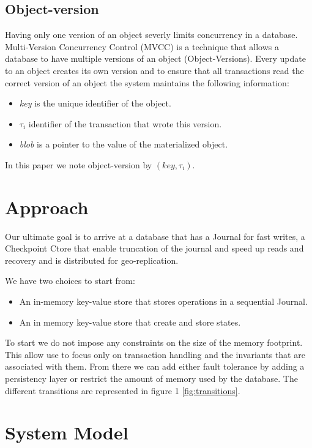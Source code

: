 \documentclass[systeme]{compas2022}
\begin{document}
\subsection{Object-version}

Having only one version of an object severly limits concurrency in a database.
Multi-Version Concurrency Control (MVCC) is a technique that allows a database to have multiple versions of an object (Object-Versions).
Every update to an object creates its own version and to ensure that all transactions read the correct version of an object the system maintains the following information: 
\begin{itemize}
  \item \emph{key} is the unique identifier of the object.
  \item \emph{$\tau_i$} identifier of the transaction that wrote this version.
  \item \emph{blob} is a pointer to the value of the materialized object.
\end{itemize}

In this paper we note object-version by $(key ,\tau_i)$.

\section{Approach}

Our ultimate goal is to arrive at a database that has a Journal for fast writes, a Checkpoint Ctore that enable truncation of the journal and speed up reads and recovery and is distributed for geo-replication.

We have two choices to start from:
\begin{itemize}
  \item An in-memory key-value store that stores operations in a sequential Journal.
  \item An in memory key-value store that create and store states.
\end{itemize}

To start we do not impose any constraints on the size of the memory footprint.
This allow use to focus only on transaction handling and the invariants that are associated with them.
From there we can add either fault tolerance by adding a persistency layer or restrict the amount of memory used by the database.
The different transitions are represented in figure 1 \ref{fig:transitions}.

\section{System Model}
\end{document}
